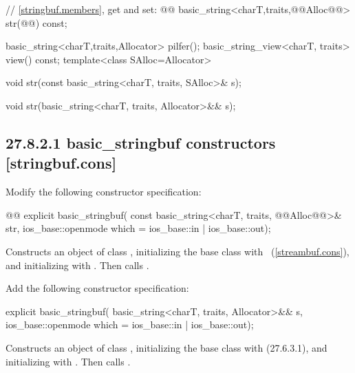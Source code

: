 \documentclass[ebook,11pt,article]{memoir}
\begin{document}
\begin{codeblock}
    // \ref{stringbuf.members}, get and set:
    @@
    basic_string<charT,traits,@@Alloc@@> str(@@) const;
\end{codeblock}
\begin{addedblock}\begin{codeblock}
    basic_string<charT,traits,Allocator> pilfer();
    basic_string_view<charT, traits> view() const;
    template<class SAlloc=Allocator>
\end{codeblock}\end{addedblock}
\begin{codeblock}
    void str(const basic_string<charT, traits, SAlloc>& s);
\end{codeblock}
\begin{addedblock}
\begin{codeblock}
    void str(basic_string<charT, traits, Allocator>&& s);
\end{codeblock}
\end{addedblock}

\subsection{27.8.2.1 basic\_stringbuf constructors [stringbuf.cons]}
Modify the following constructor specification:
\begin{itemdecl}
@@
explicit basic_stringbuf(
  const basic_string<charT, traits, @@Alloc@@>& str,
  ios_base::openmode which = ios_base::in | ios_base::out);
\end{itemdecl}

\begin{itemdescr}
\pnum
\effects
Constructs an object of class
,
initializing the base class with
~(\ref{streambuf.cons}), and initializing
with .
Then calls .
\end{itemdescr}

Add the following constructor specification:
\begin{insrt}
\begin{itemdecl}
      explicit basic_stringbuf(
        basic_string<charT, traits, Allocator>&& s,
        ios_base::openmode which = ios_base::in | ios_base::out);
\end{itemdecl}
\begin{itemdescr}
\pnum
\effects Constructs an object of class , initializing the base class with  (27.6.3.1), and initializing  with . Then calls .
\end{itemdescr}
\end{insrt}
\end{document}
